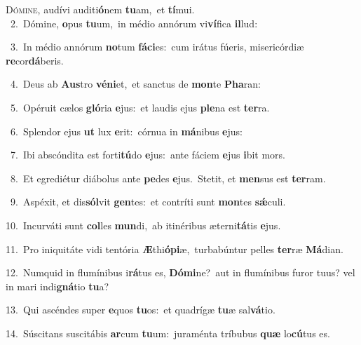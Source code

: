 \lettrine{\initial\textcolor{\initialcolor}{D}}{ómine,} audívi auditi\-\textbf{ó}\-nem \textbf{tu}\-am,~\star et \textbf{tí}\-mui.\\
{\numbfont\textcolor{\numbcolor}{~2.}}~Dómine, \textbf{o}\-pus \textbf{tu}\-um,~\star in médio annórum vi\-\textbf{ví}\-fica \textbf{il}\-lud:\par
{\numbfont\textcolor{\numbcolor}{~3.}}~In médio annórum \textbf{no}\-tum \textbf{fá}\-\textbf{ci}es:~\star cum irátus fúeris, misericórdiæ \textbf{re}\-cor\-\textbf{dá}\-beris.\par
{\numbfont\textcolor{\numbcolor}{~4.}}~Deus ab \textbf{Aus}\-tro \textbf{vé}\-\textbf{ni}et,~\star et sanctus de \textbf{mon}\-te \textbf{Pha}\-ran:\par
{\numbfont\textcolor{\numbcolor}{~5.}}~Opéruit cælos \textbf{gló}\-ria \textbf{e}\-jus:~\star et laudis ejus \textbf{ple}\-na est \textbf{ter}\-ra.\par
{\numbfont\textcolor{\numbcolor}{~6.}}~Splendor ejus \textbf{ut} lux \textbf{e}\-rit:~\star córnua in \textbf{má}\-nibus \textbf{e}\-jus:\par
{\numbfont\textcolor{\numbcolor}{~7.}}~Ibi abscóndita est forti\-\textbf{tú}\-do \textbf{e}\-jus:~\star ante fáciem \textbf{e}\-jus \textbf{i}\-bit mors.\par
{\numbfont\textcolor{\numbcolor}{~8.}}~Et egrediétur diábolus ante \textbf{pe}\-des \textbf{e}\-jus.~\star Stetit, et \textbf{men}\-sus est \textbf{ter}\-ram.\par
{\numbfont\textcolor{\numbcolor}{~9.}}~Aspéxit, et dis\-\textbf{sól}\-vit \textbf{gen}\-tes:~\star et contríti sunt \textbf{mon}\-tes \textbf{sǽ}\-culi.\par
{\numbfont\textcolor{\numbcolor}{10.}}~Incurváti sunt \textbf{col}\-les \textbf{mun}\-di,~\star ab itinéribus æterni\-\textbf{tá}\-tis \textbf{e}\-jus.\par
{\numbfont\textcolor{\numbcolor}{11.}}~Pro iniquitáte vidi tentória \textbf{Æ}\-thi\-\textbf{ó}\-\textbf{pi}æ,~\star turbabúntur pelles \textbf{ter}\-ræ \textbf{Má}\-dian.\par
{\numbfont\textcolor{\numbcolor}{12.}}~Numquid in flumínibus i\-\textbf{rá}\-tus es, \textbf{Dó}\-\textbf{mi}ne?~\star aut in flumínibus furor tuus? vel in mari indi\-\textbf{gná}\-tio \textbf{tu}\-a?\par
{\numbfont\textcolor{\numbcolor}{13.}}~Qui ascéndes super \textbf{e}\-quos \textbf{tu}\-os:~\star et quadrígæ \textbf{tu}\-æ sal\-\textbf{vá}\-tio.\par
{\numbfont\textcolor{\numbcolor}{14.}}~Súscitans suscitábis \textbf{ar}\-cum \textbf{tu}\-um:~\star juraménta tríbubus \textbf{quæ} lo\-\textbf{cú}\-tus es.\par
